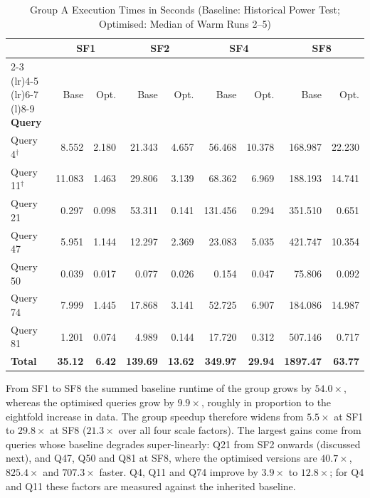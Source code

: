 \documentclass{ULBreport}
\begin{document}
\begin{table}[htbp]
\centering
\caption{Group A Execution Times in Seconds (Baseline: Historical Power Test; Optimised: Median of Warm Runs 2--5)}
\label{tab:group_a_times}
\small
\setlength{\tabcolsep}{4pt}
\begin{tabular}{@{}lrrrrrrrr@{}}
\toprule
 & \multicolumn{2}{c}{\textbf{SF1}} & \multicolumn{2}{c}{\textbf{SF2}} & \multicolumn{2}{c}{\textbf{SF4}} & \multicolumn{2}{c}{\textbf{SF8}} \\
\cmidrule(lr){2-3} \cmidrule(lr){4-5} \cmidrule(lr){6-7} \cmidrule(l){8-9}
\textbf{Query} & Base & Opt. & Base & Opt. & Base & Opt. & Base & Opt. \\ \midrule
Query 4$^\dagger$ & 8.552 & 2.180 & 21.343 & 4.657 & 56.468 & 10.378 & 168.987 & 22.230 \\
Query 11$^\dagger$ & 11.083 & 1.463 & 29.806 & 3.139 & 68.362 & 6.969 & 188.193 & 14.741 \\
Query 21 & 0.297 & 0.098 & 53.311 & 0.141 & 131.456 & 0.294 & 351.510 & 0.651 \\
Query 47 & 5.951 & 1.144 & 12.297 & 2.369 & 23.083 & 5.035 & 421.747 & 10.354 \\
Query 50 & 0.039 & 0.017 & 0.077 & 0.026 & 0.154 & 0.047 & 75.806 & 0.092 \\
Query 74 & 7.999 & 1.445 & 17.868 & 3.141 & 52.725 & 6.907 & 184.086 & 14.987 \\
Query 81 & 1.201 & 0.074 & 4.989 & 0.144 & 17.720 & 0.312 & 507.146 & 0.717 \\ \midrule
\textbf{Total} & \textbf{35.12} & \textbf{6.42} & \textbf{139.69} & \textbf{13.62} & \textbf{349.97} & \textbf{29.94} & \textbf{1897.47} & \textbf{63.77} \\ \bottomrule
\end{tabular}
\end{table}

From SF1 to SF8 the summed baseline runtime of the group grows by $54.0\times$, whereas the optimised queries grow by $9.9\times$, roughly in proportion to the eightfold increase in data. The group speedup therefore widens from $5.5\times$ at SF1 to $29.8\times$ at SF8 ($21.3\times$ over all four scale factors). The largest gains come from queries whose baseline degrades super-linearly: Q21 from SF2 onwards (discussed next), and Q47, Q50 and Q81 at SF8, where the optimised versions are $40.7\times$, $825.4\times$ and $707.3\times$ faster. Q4, Q11 and Q74 improve by $3.9\times$ to $12.8\times$; for Q4 and Q11 these factors are measured against the inherited baseline.
\end{document}
